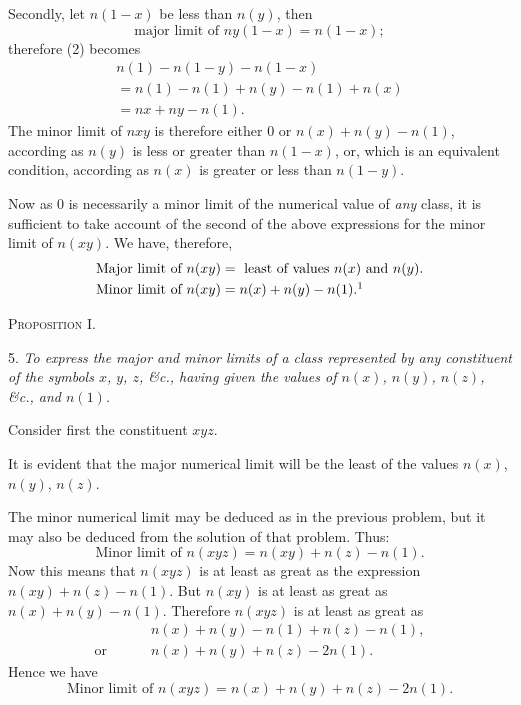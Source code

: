 \documentclass[oneside]{book}
\begin{document}
Secondly, let $n(1-x)$ be less than $n(y)$, then
\[
  \text{major limit of }ny(1-x) = n(1-x);
\]
therefore (2) becomes
\begin{gather*}
  n(1) - n(1-y) - n(1-x)  \\
= n(1) - n(1) + n(y) - n(1) + n(x)   \\
= nx + ny - n(1).
\end{gather*}
The minor limit of $nxy$ is therefore either $0$ or
$n(x) + n(y) - n(1)$,
according as $n(y)$ is less or greater than $n(1-x)$, or, which is an
equivalent condition, according as $n(x)$ is greater or less than
$n(1-y)$.

Now as $0$ is necessarily a minor limit of the numerical value
of \emph{any} class, it is sufficient to take account of the second of the
above expressions for the minor limit of $n(xy)$. We have, therefore,
\begin{align*}
  \text{Major limit of }n(xy) &=
      \text{ least of values $n(x)$ and $n(y)$.}   \\
  \text{Minor limit of }n(xy) &= n(x) + n(y) - n(1).
\footnotemark
\end{align*}

\begin{center}\textsc{Proposition I.}\end{center}

5. \emph{To express the major and minor limits of a class represented
by any constituent of the symbols $x$, $y$, $z$, \&c., having given the values
of $n(x)$, $n(y)$, $n(z)$, \&c., and $n(1)$.}

Consider first the constituent $xyz$.

It is evident that the major numerical limit will be the least
of the values $n(x)$, $n(y)$, $n(z)$.

The minor numerical limit may be deduced as in the previous
problem, but it may also be deduced from the solution of that
problem. Thus:
\[
  \text{Minor limit of }n(xyz) = n(xy) + n(z) - n(1).   \tag{1}
\]
Now this means that $n(xyz)$ is at least as great as the expression
$n(xy) + n(z) - n(1)$. But $n(xy)$ is at least as great as
$n(x) + n(y) - n(1)$. Therefore $n(xyz)$ is at least as great as
\begin{align*}
                &n(x) + n(y) - n(1) + n(z) -n(1),  \\
\text{or }\qquad &n(x) + n(y) + n(z) - 2n(1).
\end{align*}
Hence we have
\[
  \text{Minor limit of }n(xyz) = n(x) + n(y) + n(z) - 2n(1).
\]
\end{document}
